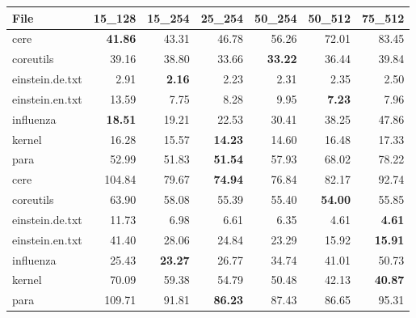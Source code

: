 \documentclass[english,twoside,censored,csm,algorithms-track-2020]{HYthesisML}
\theoremstyle{plain}
\theoremstyle{definition}
\begin{document}
\begin{center}
  \begin{table}[t]
  \begin{tabular} {|l|r r r r r r|}
    \hline
     \textbf{File} & \textbf{15\_128} & \textbf{15\_254} & \textbf{25\_254}  &\textbf{50\_254} & \textbf{50\_512} & \textbf{75\_512} \\
     \hline

     cere            & \textbf{41.86} & 43.31          & 46.78          & 56.26          & 72.01          & 83.45 \\
     coreutils       & 39.16          & 38.80          & 33.66          & \textbf{33.22} & 36.44           & 39.84 \\
     einstein.de.txt & 2.91           & \textbf{2.16}  & 2.23           & 2.31           & 2.35           & 2.50  \\
     einstein.en.txt & 13.59          & 7.75           & 8.28           & 9.95           & \textbf{7.23}  & 7.96  \\
     influenza       & \textbf{18.51} & 19.21          & 22.53          & 30.41          & 38.25          & 47.86 \\
     kernel          & 16.28          & 15.57          & \textbf{14.23} & 14.60          & 16.48          & 17.33 \\
     para            & 52.99          & 51.83          & \textbf{51.54} & 57.93          & 68.02          & 78.22 \\

     \hline

     cere            & 104.84 & 79.67          & \textbf{74.94} & 76.84 & 82.17          & 92.74          \\
     coreutils       & 63.90  & 58.08          & 55.39          & 55.40 & \textbf{54.00} & 55.85          \\
     einstein.de.txt & 11.73  & 6.98           & 6.61           & 6.35  & 4.61           & \textbf{4.61}  \\
     einstein.en.txt & 41.40  & 28.06          & 24.84          & 23.29 & 15.92          & \textbf{15.91} \\
     influenza       & 25.43  & \textbf{23.27} & 26.77          & 34.74 & 41.01          & 50.73          \\
     kernel          & 70.09  & 59.38          & 54.79          & 50.48 & 42.13          & \textbf{40.87} \\
     para            & 109.71 & 91.81          & \textbf{86.23} & 87.43 & 86.65          & 95.31          \\
     

\end{tabular}
\end{table}
\end{center}
\end{document}
